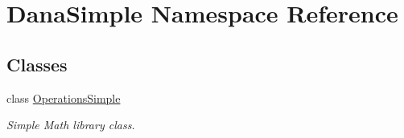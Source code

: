 \hypertarget{namespaceDanaSimple}{}\section{Dana\+Simple Namespace Reference}
\label{namespaceDanaSimple}
\subsection*{Classes}
\begin{DoxyCompactItemize}
\item 
class \hyperlink{classDanaSimple_1_1OperationsSimple}{Operations\+Simple}
\begin{DoxyCompactList}\small\item\em Simple Math library class. \end{DoxyCompactList}\end{DoxyCompactItemize}

